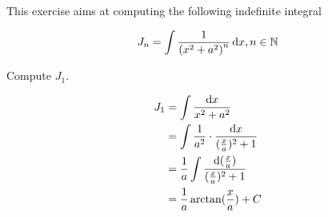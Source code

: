 \documentclass{alittlebear}
\begin{document}
\begin{exercise}{}{}
    \begin{note}
        This exercise aims at computing the following indefinite integral

        $$J_{n}=\int \frac{1}{\left(x^{2}+a^{2}\right)^{n}}\mathop{}\!\mathrm{d} x, n \in \mathbb{N}$$
    \end{note}

    \begin{question}{}{}
        Compute $J_{1}$.
        \tcblower

        \begin{mathnote}
            \begin{align*}
                J_1&=\int \frac{\mathop{}\!\mathrm{d} x}{x^2+a^2}\\
                &=\int \frac1{a^2}\cdot\frac{\mathop{}\!\mathrm{d} x}{(\frac{x}a)^2+1}\\
                &=\frac1a \int \frac{\mathop{}\!\mathrm{d} (\frac{x}a)}{(\frac{x}a)^2+1}\\
                &=\frac1a\arctan(\frac{x}a)+C
            \end{align*}
        \end{mathnote}
    \end{question}


\end{exercise}
\end{document}
